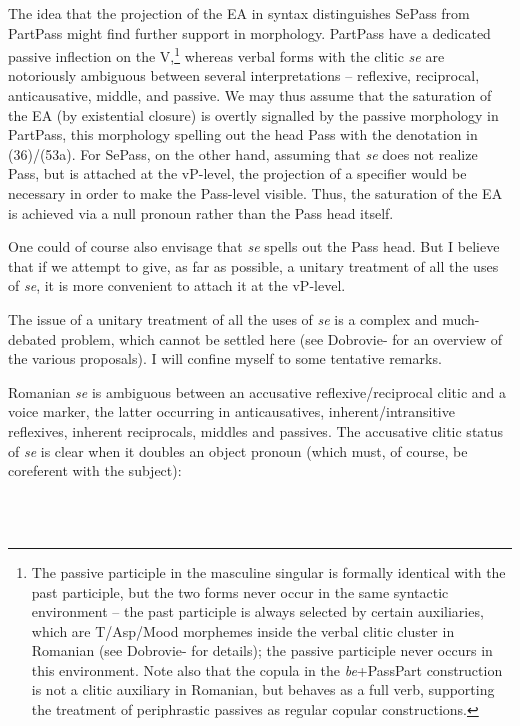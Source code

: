 \documentclass[output=paper]{langsci/langscibook}
\begin{document}
The idea that the projection of the EA in syntax distinguishes SePass from PartPass might find further support in morphology. PartPass have a dedicated passive inflection on the V,\footnote{The passive participle in the masculine singular is formally identical with the past participle, but the two forms never occur in the same syntactic environment – the past participle is always selected by certain auxiliaries, which are T/Asp/Mood morphemes inside the verbal clitic cluster in Romanian (see Dobrovie-\citet{Sorin1994} for details); the passive participle never occurs in this environment. Note also that the copula in the \textit{be}+PassPart construction is not a clitic auxiliary in Romanian, but behaves as a full verb, supporting the treatment of periphrastic passives as regular copular constructions.}  whereas verbal forms with the clitic \textit{se} are notoriously ambiguous between several interpretations – reflexive, reciprocal, anticausative, middle, and passive. We may thus assume that the saturation of the EA (by existential closure) is overtly signalled by the passive morphology in PartPass, this morphology spelling out the head Pass with the denotation in (36)/(53a). For SePass, on the other hand, assuming that \textit{se} does not realize Pass, but is attached at the vP-level, the projection of a specifier would be necessary in order to make the Pass-level visible. Thus, the saturation of the EA is achieved via a null pronoun rather than the Pass head itself.

One could of course also envisage that \textit{se} spells out the Pass head. But I believe that if we attempt to give, as far as possible, a unitary treatment of all the uses of \textit{se}, it is more convenient to  attach it at the vP-level.

The issue of a unitary treatment of all the uses of \textit{se} is a complex and much-debated problem, which cannot be settled here (see Dobrovie-\citealt{Sorin2017} for an overview of the various proposals). I will confine myself to some tentative remarks.

Romanian \textit{se} is ambiguous between an accusative reflexive/reciprocal clitic and a voice marker, the latter occurring in anticausatives, inherent/intransitive reflexives, inherent reciprocals, middles and passives. The accusative clitic status of \textit{se} is clear when it doubles an object pronoun (which must, of course, be coreferent with the subject):

\ea%
    \label{ex:key:54}
    \gll\\
        \\
    \glt
    \z
\end{document}
